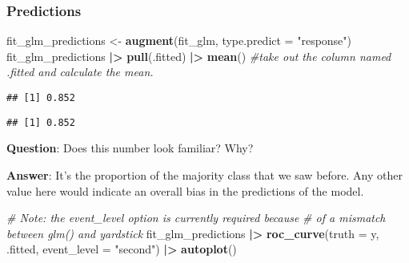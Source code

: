 \documentclass[
]{article}
\newenvironment{Shaded}{\begin{snugshade}}{\end{snugshade}}
\newcommand{\AttributeTok}[1]{\textcolor[rgb]{0.13,0.29,0.53}{#1}}
\newcommand{\CommentTok}[1]{\textcolor[rgb]{0.56,0.35,0.01}{\textit{#1}}}
\newcommand{\FunctionTok}[1]{\textcolor[rgb]{0.13,0.29,0.53}{\textbf{#1}}}
\newcommand{\NormalTok}[1]{#1}
\newcommand{\OtherTok}[1]{\textcolor[rgb]{0.56,0.35,0.01}{#1}}
\newcommand{\SpecialCharTok}[1]{\textcolor[rgb]{0.81,0.36,0.00}{\textbf{#1}}}
\newcommand{\StringTok}[1]{\textcolor[rgb]{0.31,0.60,0.02}{#1}}
\begin{document}
\subsubsection{Predictions}\label{predictions}

\begin{Shaded}
\begin{Highlighting}[]
\NormalTok{fit\_glm\_predictions }\OtherTok{\textless{}{-}} \FunctionTok{augment}\NormalTok{(fit\_glm, }\AttributeTok{type.predict =} \StringTok{"response"}\NormalTok{)}
\NormalTok{fit\_glm\_predictions }\SpecialCharTok{|\textgreater{}} \FunctionTok{pull}\NormalTok{(.fitted) }\SpecialCharTok{|\textgreater{}} \FunctionTok{mean}\NormalTok{() }\CommentTok{\#take out the column named .fitted and calculate the mean.}
\end{Highlighting}
\end{Shaded}

\begin{verbatim}
## [1] 0.852
\end{verbatim}

\begin{Shaded}
\end{Shaded}

\begin{verbatim}
## [1] 0.852
\end{verbatim}

\textbf{Question}: Does this number look familiar? Why?

\textbf{Answer}: It's the proportion of the majority class that we saw
before. Any other value here would indicate an overall bias in the
predictions of the model.

\begin{Shaded}
\begin{Highlighting}[]
\CommentTok{\# Note: the event\_level option is currently required because}
\CommentTok{\# of a mismatch between glm() and yardstick}
\NormalTok{fit\_glm\_predictions }\SpecialCharTok{|\textgreater{}}
  \FunctionTok{roc\_curve}\NormalTok{(}\AttributeTok{truth =}\NormalTok{ y, .fitted,}
            \AttributeTok{event\_level =} \StringTok{"second"}\NormalTok{) }\SpecialCharTok{|\textgreater{}}
  \FunctionTok{autoplot}\NormalTok{()}
\end{Highlighting}
\end{Shaded}
\end{document}
